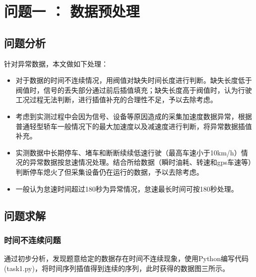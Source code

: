 \documentclass[bwprint]{gmcmthesis}
\begin{document}
\section{问题一 ： 数据预处理}
\subsection{问题分析}
针对异常数据，本文做如下处理：
\begin{itemize}
\item 对于数据的时间不连续情况，用阀值对缺失时间长度进行判断。缺失长度低于阀值时，信号的丢失部分通过前后插值填充；缺失长度高于阀值时，认为行驶工况过程无法判断，进行插值补充的合理性不足，予以去除考虑。
\item 考虑到实测过程中会因为信号、设备等原因造成的采集加速度数据异常，根据普通轻型轿车一般情况下的最大加速度以及减速度进行判断，将异常数据插值补充。
\item 实测数据中长期停车、堵车和断断续续低速行驶（最高车速小于10km/h）情况的异常数据按怠速情况处理。结合所给数据（瞬时油耗、转速和gps车速等）判断停车熄火了但采集设备仍在运行的数据，予以去除考虑。
\item 一般认为怠速时间超过180秒为异常情况，怠速最长时间可按180秒处理。
\end{itemize}

\subsection{问题求解}
\subsubsection{时间不连续问题}
通过初步分析，发现题意给定的数据存在时间不连续现象，使用Python编写代码(task1.py)，将时间序列插值得到连续的序列，此时获得的数据图三所示。
\end{document}
